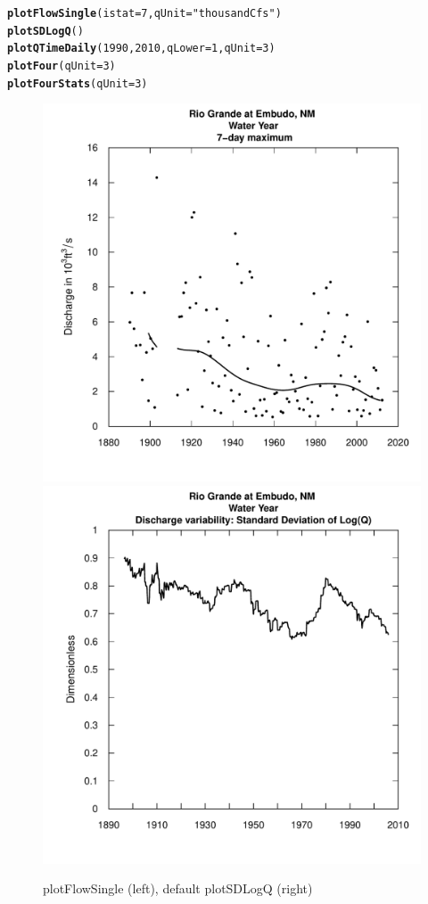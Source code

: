 \documentclass[a4paper,11pt]{article}\usepackage{graphicx, color}
\makeatletter
\newcommand{\hlfunctioncall}[1]{\textcolor[rgb]{0.501960784313725,0,0.329411764705882}{\textbf{#1}}}%
\newcommand{\hlstring}[1]{\textcolor[rgb]{0.6,0.6,1}{#1}}%
\newenvironment{kframe}{%
 \def\at@end@of@kframe{}%
 \ifinner\ifhmode%
  \def\at@end@of@kframe{\end{minipage}}%
  \begin{minipage}{\columnwidth}%
 \fi\fi%
 \def\FrameCommand##1{\hskip\@totalleftmargin \hskip-\fboxsep
 \colorbox{shadecolor}{##1}\hskip-\fboxsep
     \hskip-\linewidth \hskip-\@totalleftmargin \hskip\columnwidth}%
 \MakeFramed {\advance\hsize-\width
   \@totalleftmargin\z@ \linewidth\hsize
   \@setminipage}}%
 {\par\unskip\endMakeFramed%
 \at@end@of@kframe}
\newenvironment{knitrout}{}{} %
\makeatother
\begin{document}
\begin{knitrout}
\color{fgcolor}\begin{kframe}
\begin{alltt}
\hlfunctioncall{plotFlowSingle}(istat=7,qUnit=\hlstring{"thousandCfs"})
\hlfunctioncall{plotSDLogQ}()
\hlfunctioncall{plotQTimeDaily}(1990,2010,qLower=1,qUnit=3)
\hlfunctioncall{plotFour}(qUnit=3)
\hlfunctioncall{plotFourStats}(qUnit=3)
\end{alltt}
\end{kframe}
\end{knitrout}


\begin{knitrout}
\color{fgcolor}\begin{figure}[]

\includegraphics[width=.5\linewidth,height=.5\linewidth]{figure/plotSingleandSD1} 
\includegraphics[width=.5\linewidth,height=.5\linewidth]{figure/plotSingleandSD2} \caption[plotFlowSingle (left), default plotSDLogQ (right)]{plotFlowSingle (left), default plotSDLogQ (right)\label{fig:plotSingleandSD}}
\end{figure}


\end{knitrout}
\end{document}
